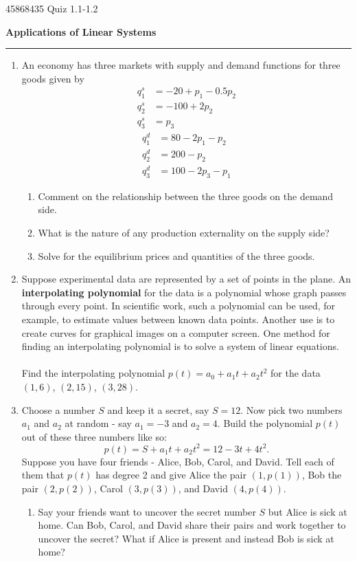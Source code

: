 \documentclass[12pt]{article}
\begin{document}
45868435
Quiz 1.1-1.2

\begin{center}
{\bf \Large Applications of Linear Systems}
\vspace{0.2cm}
\hrule
\end{center}

\begin{enumerate}
	\item An economy has three markets with supply and demand functions for three goods given by
	\begin{align*}
		q_1^s&= -20 + p_1 -0.5p_2\\
		q_2^s&= -100 + 2p_2\\
		q_3^s&= p_3
	\end{align*}
	\begin{align*}
		q_1^d &= 80 - 2p_1-p_2\\
		q_2^d &= 200 - p_2\\
		q_3^d &= 100-2p_3-p_1
	\end{align*}
	\begin{enumerate}
		\item Comment on the relationship between the three goods on the demand side.
		\vfill
		\item What is the nature of any production externality on the supply side?
		\vfill
		\item Solve for the equilibrium prices and quantities of the three goods.
	\end{enumerate}
	\vfill

	\item Suppose experimental data are represented by a set of points in the plane. An \textbf{interpolating polynomial} for the data is a polynomial whose graph passes through every point. In scientific work, such a polynomial can be used, for example, to estimate values between known data points. Another use is to create curves for graphical images on a computer screen. One method for finding an interpolating polynomial is to solve a system of linear equations.\\\\Find the interpolating polynomial $p(t) = a_0+a_1t+a_2t^2$ for the data $(1, 6)$, $(2, 15)$, $(3, 28)$.
	\vfill\null\pagebreak

	\item Choose a number $S$ and keep it a secret, say $S = 12$. Now pick two numbers $a_1$ and $a_2$ at random - say $a_1 = -3$ and $a_2 = 4$. Build the polynomial $p(t)$ out of these three numbers like so:
	\[
	p(t) = S + a_1t + a_2t^2 = 12 - 3t + 4t^2.
	\]
	Suppose you have four friends - Alice, Bob, Carol, and David. Tell each of them that $p(t)$ has degree 2 and give Alice the pair $(1, p(1))$, Bob the pair $(2, p(2))$, Carol $(3, p(3))$, and David $(4, p(4))$.
	\begin{enumerate}
		\item Say your friends want to uncover the secret number $S$ but Alice is sick at home. Can Bob, Carol, and David share their pairs and work together to uncover the secret? What if Alice is present and instead Bob is sick at home?


\end{enumerate}
\end{enumerate}
\end{document}
